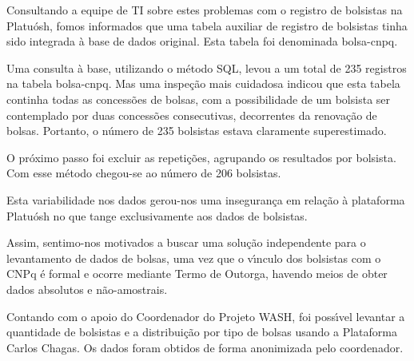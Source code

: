 \documentclass[
12pt,		%
openright,	%
twoside,  %
a4paper,			%
chapter=TITLE,		%
english,			%
french,				%
spanish,			%
brazil				%
]{USPSC-classe/USPSC}
\begin{document}
Consultando a equipe de TI sobre estes problemas com o registro de bolsistas na Platu\'osh, fomos informados que uma tabela auxiliar de registro de bolsistas tinha sido integrada \`a base de dados original. Esta tabela foi denominada \textquotedbl bolsa-cnpq\textquotedbl .










Uma consulta \`a base, utilizando o m\'etodo SQL, levou a um total de 235 registros na tabela \textquotedbl bolsa-cnpq\textquotedbl . Mas uma inspe\c{c}\~ao mais cuidadosa indicou que esta tabela continha todas as concess\~oes de bolsas, com a possibilidade de um bolsista ser contemplado por duas concess\~oes consecutivas, decorrentes da renova\c{c}\~ao de bolsas. Portanto, o n\'umero de 235 bolsistas estava claramente superestimado.










O pr\'oximo passo foi excluir as repeti\c{c}\~oes, agrupando os resultados por bolsista. Com esse m\'etodo chegou-se ao n\'umero de 206 bolsistas.










Esta variabilidade nos dados gerou-nos uma inseguran\c{c}a em rela\c{c}\~ao \`a plataforma Platu\'osh no que tange exclusivamente aos dados de bolsistas.










Assim, sentimo-nos motivados a buscar uma solu\c{c}\~ao independente para o levantamento de dados de bolsas, uma vez que o v\'{\i}nculo dos bolsistas com o CNPq \'e formal e ocorre mediante Termo de Outorga, havendo meios de obter dados absolutos e n\~ao-amostrais.










Contando com o apoio do Coordenador do Projeto WASH, foi poss\'{\i}vel levantar a quantidade de bolsistas e a distribui\c{c}\~ao por tipo de bolsas usando a Plataforma Carlos Chagas. Os dados foram obtidos de forma anonimizada pelo coordenador.
\end{document}
